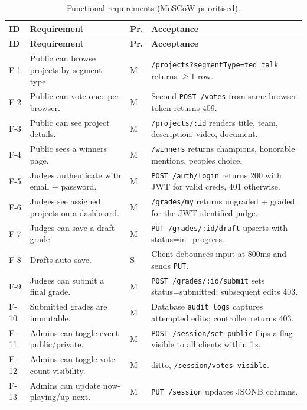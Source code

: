 \begin{longtable}{p{}p{}p{}p{}}
  \caption{Functional requirements (MoSCoW prioritised).}\label{tab:func-req}\\
  \toprule
  \textbf{ID} & \textbf{Requirement} & \textbf{Pr.} & \textbf{Acceptance} \\
  \midrule
  \endfirsthead
  \toprule
  \textbf{ID} & \textbf{Requirement} & \textbf{Pr.} & \textbf{Acceptance} \\
  \midrule
  \endhead

  F-1  & Public can browse projects by segment type. & M & \texttt{/projects?segmentType=ted\_talk} returns $\geq 1$ row. \\
  F-2  & Public can vote once per browser. & M & Second \texttt{POST /votes} from same browser token returns 409. \\
  F-3  & Public can see project details. & M & \texttt{/projects/:id} renders title, team, description, video, document. \\
  F-4  & Public sees a winners page. & M & \texttt{/winners} returns champions, honorable mentions, peoples choice. \\
  F-5  & Judges authenticate with email + password. & M & \texttt{POST /auth/login} returns 200 with JWT for valid creds, 401 otherwise. \\
  F-6  & Judges see assigned projects on a dashboard. & M & \texttt{/grades/my} returns ungraded + graded for the JWT-identified judge. \\
  F-7  & Judges can save a draft grade. & M & \texttt{PUT /grades/:id/draft} upserts with status=in\_progress. \\
  F-8  & Drafts auto-save. & S & Client debounces input at 800ms and sends \texttt{PUT}. \\
  F-9  & Judges can submit a final grade. & M & \texttt{POST /grades/:id/submit} sets status=submitted; subsequent edits 403. \\
  F-10 & Submitted grades are immutable. & M & Database \texttt{audit\_logs} captures attempted edits; controller returns 403. \\
  F-11 & Admins can toggle event public/private. & M & \texttt{POST /session/set-public} flips a flag visible to all clients within 1\,s. \\
  F-12 & Admins can toggle vote-count visibility. & M & ditto, \texttt{/session/votes-visible}. \\
  F-13 & Admins can update now-playing/up-next. & M & \texttt{PUT /session} updates JSONB columns. \\

\end{longtable}
